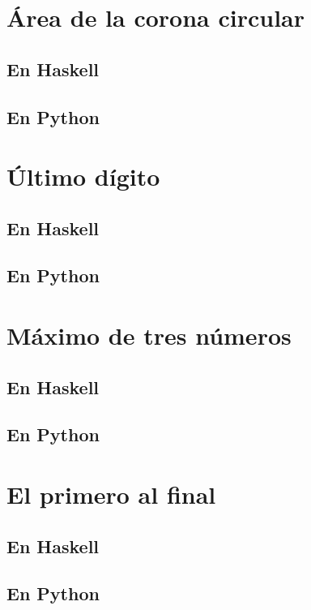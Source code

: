 \documentclass[a4paper,12pt,twoside]{book}
\begin{document}
\section{Área de la corona circular}
\subsection*{En Haskell}
\subsection*{En Python}

\section{Último dígito}
\subsection*{En Haskell}
\subsection*{En Python}

\section{Máximo de tres números}
\subsection*{En Haskell}
\subsection*{En Python}

\section{El primero al final}
\subsection*{En Haskell}
\subsection*{En Python}
\end{document}

